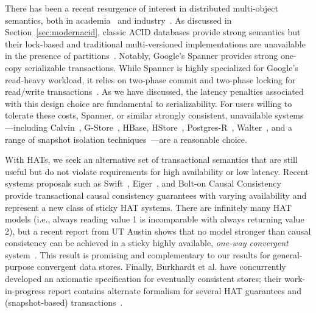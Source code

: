 There has been a recent resurgence of interest in distributed
multi-object semantics, both in academia~\cite{kraska-s3, gstore,
  eiger, walter,calvin, swift} and industry~\cite{spanner}. As
discussed in Section~\ref{sec:modernacid}, classic ACID databases
provide strong semantics but their lock-based and traditional
multi-versioned implementations are unavailable in the presence of
partitions~\cite{bernstein-book, gray-isolation}. Notably, Google's
Spanner provides strong one-copy serializable transactions. While
Spanner is highly specialized for Google's read-heavy workload, it
relies on two-phase commit and two-phase locking for read/write
transactions~\cite{spanner}. As we have discussed, the latency
penalties associated with this design choice are fundamental to
serializability. For users willing to tolerate these costs, Spanner,
or similar strongly consistent, unavailable systems---including
Calvin~\cite{calvin}, G-Store~\cite{gstore}, HBase,
HStore~\cite{hstore}, Postgres-R~\cite{kemme-thesis},
Walter~\cite{walter}, and a range of snapshot isolation
techniques~\cite{daudjee-session, daudjee-snapshot}---are a reasonable
choice.

With HATs, we seek an alternative set of transactional semantics that
are still useful but do not violate requirements for high availability
or low latency. Recent systems proposals such as Swift~\cite{swift},
Eiger~\cite{eiger}, and Bolt-on Causal Consistency~\cite{bolton}
provide transactional causal consistency guarantees with varying
availability and represent a new class of sticky HAT systems. There
are infinitely many HAT models (i.e., always reading value 1 is
incomparable with always returning value 2), but a recent report from
UT Austin shows that no model stronger than causal consistency can be
achieved in a sticky highly available, \textit{one-way convergent}
system~\cite{cac}. This result is promising and complementary to our
results for general-purpose convergent data stores. Finally, Burkhardt
et al. have concurrently developed an axiomatic specification for
eventually consistent stores; their work-in-progress report contains
alternate formalism for several HAT guarantees and (snapshot-based)
transactions~\cite{burkhardt-txns}.






